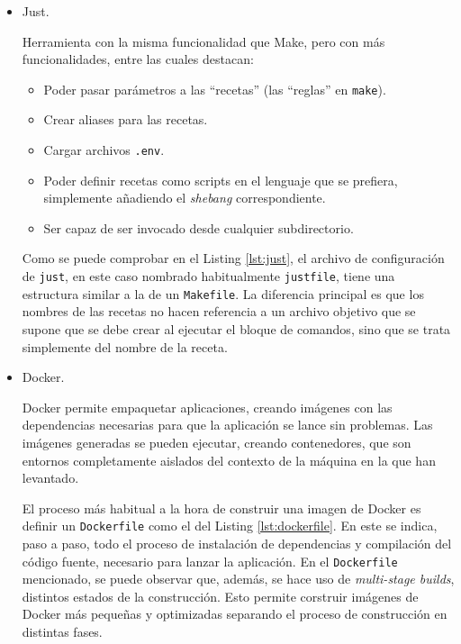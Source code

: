 \begin{itemize}
  \item Just. \label{tech:just}

    Herramienta con la misma funcionalidad que Make, pero con más funcionalidades, entre las cuales destacan:

    \begin{itemize}
      \item Poder pasar parámetros a las ``recetas'' (las ``reglas'' en \texttt{make}).
      \item Crear aliases para las recetas.
      \item Cargar archivos \texttt{.env}.
      \item Poder definir recetas como scripts en el lenguaje que se prefiera, simplemente añadiendo el \textit{shebang}\cite{shebang} correspondiente.
      \item Ser capaz de ser invocado desde cualquier subdirectorio.
    \end{itemize}

    Como se puede comprobar en el Listing \ref{lst:just}, el archivo de configuración de \texttt{just}, en este caso nombrado habitualmente \texttt{justfile}, tiene una estructura similar a la de un \texttt{Makefile}. La diferencia principal es que los nombres de las recetas no hacen referencia a un archivo objetivo que se supone que se debe crear al ejecutar el bloque de comandos, sino que se trata simplemente del nombre de la receta.

  \item Docker. \label{tech:docker}

    Docker permite empaquetar aplicaciones, creando imágenes con las dependencias necesarias para que la aplicación se lance sin problemas. Las imágenes generadas se pueden ejecutar, creando contenedores, que son entornos completamente aislados del contexto de la máquina en la que han levantado.

    El proceso más habitual a la hora de construir una imagen de Docker es definir un \texttt{Dockerfile} como el del Listing \ref{lst:dockerfile}. En este se indica, paso a paso, todo el proceso de instalación de dependencias y compilación del código fuente, necesario para lanzar la aplicación. En el \texttt{Dockerfile} mencionado, se puede observar que, además, se hace uso de \textit{multi-stage builds}, distintos estados de la construcción. Esto permite corstruir imágenes de Docker más pequeñas y optimizadas separando el proceso de construcción en distintas fases.


\end{itemize}
